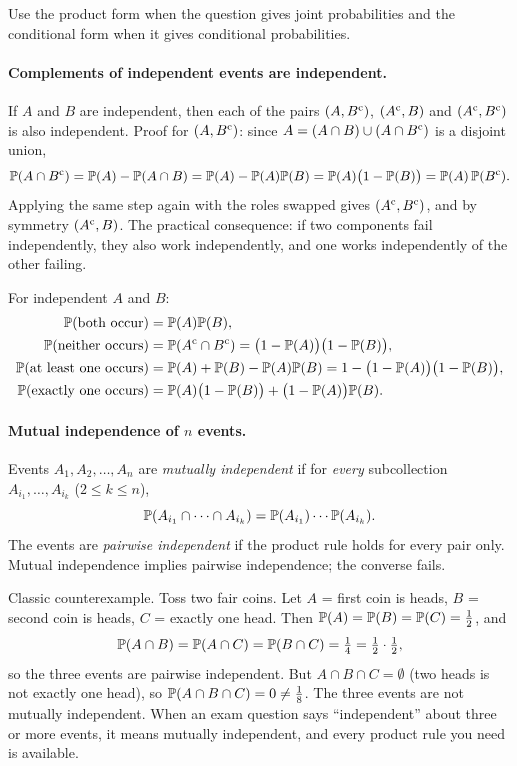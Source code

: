 Use the product form when the question gives joint probabilities and the conditional form when it gives conditional probabilities.

\paragraph{Complements of independent events are independent.}
If $A$ and $B$ are independent, then each of the pairs $(A, B^{\mathrm{c}})$, $(A^{\mathrm{c}}, B)$ and $(A^{\mathrm{c}}, B^{\mathrm{c}})$ is also independent. Proof for $(A, B^{\mathrm{c}})$: since $A = (A \cap B) \cup (A \cap B^{\mathrm{c}})$ is a disjoint union,
\[
\mathbb{P}(A \cap B^{\mathrm{c}}) = \mathbb{P}(A) - \mathbb{P}(A \cap B) = \mathbb{P}(A) - \mathbb{P}(A)\mathbb{P}(B) = \mathbb{P}(A)\bigl(1 - \mathbb{P}(B)\bigr) = \mathbb{P}(A)\,\mathbb{P}(B^{\mathrm{c}}).
\]
Applying the same step again with the roles swapped gives $(A^{\mathrm{c}}, B^{\mathrm{c}})$, and by symmetry $(A^{\mathrm{c}}, B)$. The practical consequence: if two components fail independently, they also work independently, and one works independently of the other failing.

\begin{keyfact}
For independent $A$ and $B$:
\begin{align*}
\mathbb{P}(\text{both occur}) &= \mathbb{P}(A)\mathbb{P}(B), \\
\mathbb{P}(\text{neither occurs}) &= \mathbb{P}(A^{\mathrm{c}} \cap B^{\mathrm{c}}) = \bigl(1 - \mathbb{P}(A)\bigr)\bigl(1 - \mathbb{P}(B)\bigr), \\
\mathbb{P}(\text{at least one occurs}) &= \mathbb{P}(A) + \mathbb{P}(B) - \mathbb{P}(A)\mathbb{P}(B) = 1 - \bigl(1-\mathbb{P}(A)\bigr)\bigl(1-\mathbb{P}(B)\bigr), \\
\mathbb{P}(\text{exactly one occurs}) &= \mathbb{P}(A)\bigl(1 - \mathbb{P}(B)\bigr) + \bigl(1 - \mathbb{P}(A)\bigr)\mathbb{P}(B).
\end{align*}
\end{keyfact}

\paragraph{Mutual independence of $n$ events.}
Events $A_1, A_2, \dots, A_n$ are \emph{mutually independent} if for \emph{every} subcollection $A_{i_1}, \dots, A_{i_k}$ ($2 \le k \le n$),
\[
\mathbb{P}(A_{i_1} \cap \cdots \cap A_{i_k}) = \mathbb{P}(A_{i_1}) \cdots \mathbb{P}(A_{i_k}).
\]
The events are \emph{pairwise independent} if the product rule holds for every pair only. Mutual independence implies pairwise independence; the converse fails.

Classic counterexample. Toss two fair coins. Let $A$ = first coin is heads, $B$ = second coin is heads, $C$ = exactly one head. Then $\mathbb{P}(A) = \mathbb{P}(B) = \mathbb{P}(C) = \tfrac12$, and
\[
\mathbb{P}(A \cap B) = \mathbb{P}(A \cap C) = \mathbb{P}(B \cap C) = \tfrac14 = \tfrac12 \cdot \tfrac12,
\]
so the three events are pairwise independent. But $A \cap B \cap C = \emptyset$ (two heads is not exactly one head), so $\mathbb{P}(A \cap B \cap C) = 0 \ne \tfrac18$. The three events are not mutually independent. When an exam question says ``independent'' about three or more events, it means mutually independent, and every product rule you need is available.


